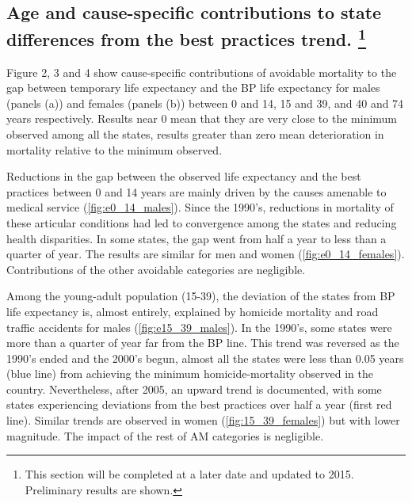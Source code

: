 \documentclass{article}
\begin{document}
\begin{spacing}{1.5}


\subsection*{Age and cause-specific contributions to state differences from the best
practices trend. \footnote{This section will be completed at a later date and updated to 2015. Preliminary results are shown.
}}

Figure 2, 3 and 4  show cause-specific contributions of avoidable mortality to the gap between temporary life expectancy and the BP life expectancy for males (panels (a))  and females (panels (b)) between 0 and 14, 15 and 39, and 40 and 74 years respectively. Results near 0 mean that they are very close to the minimum observed among all the states, results greater than zero mean deterioration in mortality relative to the minimum observed. 

Reductions in the gap between the observed life expectancy and the best practices between 0 and 14 years are mainly driven by the causes amenable to medical service (\ref{fig:e0_14_males}). Since the 1990's, reductions in mortality of these articular conditions had led to convergence among the states and reducing health disparities. In some states, the gap went from half a year to less than a quarter of year. The results are similar for men and women (\ref{fig:e0_14_females}). Contributions of the other avoidable categories are negligible. 

Among the young-adult population (15-39), the deviation of the states from BP life expectancy is, almost entirely, explained by homicide mortality and road traffic accidents for males (\ref{fig:e15_39_males}). In the 1990's, some states were more than a quarter of year far from the BP line. This trend was reversed as the 1990's ended and the 2000's begun, almost all the states were less than 0.05 years (blue line) from achieving the minimum homicide-mortality observed in the country. Nevertheless, after 2005, an upward trend is documented, with some states experiencing deviations from the best practices over half a year (first red line). Similar trends are observed in women (\ref{fig:15_39_females}) but with lower magnitude. The impact of the rest of AM categories is negligible. 



\end{spacing}
\end{document}
